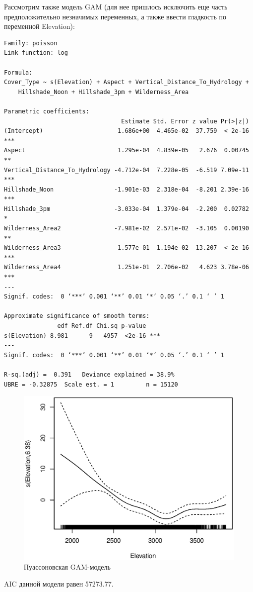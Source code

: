 \documentclass[12pt]{article}
\begin{document}
Рассмотрим также модель GAM (для нее пришлось исключить еще часть предположительно незначимых переменных, а также ввести гладкость
по переменной Elevation):
\begin{verbatim}
Family: poisson
Link function: log

Formula:
Cover_Type ~ s(Elevation) + Aspect + Vertical_Distance_To_Hydrology +
    Hillshade_Noon + Hillshade_3pm + Wilderness_Area

Parametric coefficients:
                                 Estimate Std. Error z value Pr(>|z|)
(Intercept)                     1.686e+00  4.465e-02  37.759  < 2e-16 ***
Aspect                          1.295e-04  4.839e-05   2.676  0.00745 **
Vertical_Distance_To_Hydrology -4.712e-04  7.228e-05  -6.519 7.09e-11 ***
Hillshade_Noon                 -1.901e-03  2.318e-04  -8.201 2.39e-16 ***
Hillshade_3pm                  -3.033e-04  1.379e-04  -2.200  0.02782 *
Wilderness_Area2               -7.981e-02  2.571e-02  -3.105  0.00190 **
Wilderness_Area3                1.577e-01  1.194e-02  13.207  < 2e-16 ***
Wilderness_Area4                1.251e-01  2.706e-02   4.623 3.78e-06 ***
---
Signif. codes:  0 ‘***’ 0.001 ‘**’ 0.01 ‘*’ 0.05 ‘.’ 0.1 ‘ ’ 1

Approximate significance of smooth terms:
               edf Ref.df Chi.sq p-value
s(Elevation) 8.981      9   4957  <2e-16 ***
---
Signif. codes:  0 ‘***’ 0.001 ‘**’ 0.01 ‘*’ 0.05 ‘.’ 0.1 ‘ ’ 1

R-sq.(adj) =  0.391   Deviance explained = 38.9%
UBRE = -0.32875  Scale est. = 1         n = 15120
\end{verbatim}
\begin{figure}
\includegraphics{gam1}
\caption{Пуассоновская GAM-модель}
\end{figure}
AIC данной модели равен 57273.77.
\end{document}
